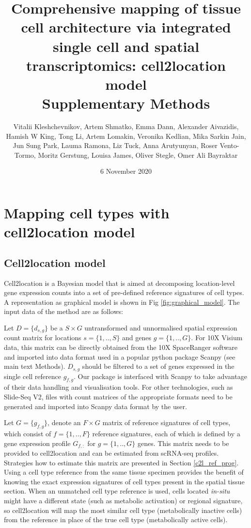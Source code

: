 \documentclass[11pt,a4paper]{article}
\title{Comprehensive mapping of tissue cell architecture via integrated single cell and spatial transcriptomics: cell2location model \\
Supplementary Methods
}
\author{Vitalii Kleshchevnikov, Artem Shmatko, Emma Dann, Alexander Aivazidis, Hamish W King, Tong Li, Artem Lomakin, Veronika Kedlian, Mika Sarkin Jain, Jun Sung Park, Lauma Ramona, Liz Tuck, Anna Arutyunyan, Roser Vento-Tormo, Moritz Gerstung, Louisa James, Oliver Stegle, Omer Ali Bayraktar}
\date{6 November 2020}
\begin{document}
\maketitle

\tableofcontents

\section{Mapping cell types with cell2location model}

\subsection{Cell2location model} \label{cell2location_model}

Cell2location is a Bayesian model that is aimed at decomposing location-level gene expression counts into a set of pre-defined reference signatures of cell types. A representation as graphical model is shown in Fig \ref{fig:graphical_model}. The input data of the method are as follows: \newline

Let $D=\{d_{s,g}\}$ be a $S \times G$ untransformed and unnormalised spatial expression count matrix for locations $s=\{1,..,S\}$ and genes $g=\{1,..,G\}$. For 10X Visium data, this matrix can be directly obtained from the 10X SpaceRanger software and imported into data format used in a popular python package Scanpy \autocite{wolf_scanpy_2018} (see main text Methods). $D_{s,g}$ should be filtered to a set of genes expressed in the single cell reference $g_{f,g}$. Our package is interfaced with Scanpy to take advantage of their data handling and visualisation tools. For other technologies, such as Slide-Seq V2, files with count matrices of the appropriate formats need to be generated and imported into Scanpy data format by the user. \newline

Let $G=\{g_{f,g}\}$, denote an $F \times G$ matrix of reference signatures of cell types, which consist of $f=\{1,..,F\}$ reference signatures, each of which is defined by a gene expression profile $G_{f,:}$ for $g=\{1,..,G\}$ genes. This matrix needs to be provided to cell2location and can be estimated from scRNA-seq profiles. Strategies how to estimate this matrix are presented in Section \ref{c2l_ref_prog}. \newline
Using a cell type reference from the same tissue specimen provides the benefit of knowing the exact expression signatures of cell types present in the spatial tissue section. When an unmatched cell type reference is used, cells located \emph{in-situ} might have a different state (such as metabolic activation) or regional signature, so cell2location will map the most similar cell type (metabolically inactive cells) from the reference in place of the true cell type (metabolically active cells). \newline
\end{document}
